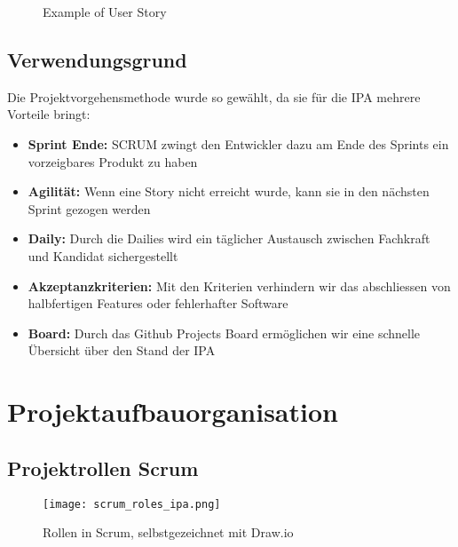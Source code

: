 \begin{figure}[h]
    \centering
    \caption{Example of User Story}
\end{figure}

\section{Verwendungsgrund}
Die Projektvorgehensmethode wurde so gewählt, da sie für die IPA mehrere Vorteile bringt:

\begin{itemize}
    \item \textbf{Sprint Ende:} SCRUM zwingt den Entwickler dazu am Ende des Sprints ein vorzeigbares Produkt zu haben
    \item \textbf{Agilität:} Wenn eine Story nicht erreicht wurde, kann sie in den nächsten Sprint gezogen werden
    \item \textbf{Daily:} Durch die Dailies wird ein täglicher Austausch zwischen Fachkraft und Kandidat sichergestellt
    \item \textbf{Akzeptanzkriterien:} Mit den Kriterien verhindern wir das abschliessen von halbfertigen Features oder fehlerhafter Software
    \item \textbf{Board:} Durch das Github Projects Board ermöglichen wir eine schnelle Übersicht über den Stand der IPA
\end{itemize}

\chapter{Projektaufbauorganisation}

\section{Projektrollen Scrum}

\begin{figure}[h]
    \centering
    \texttt{[image: scrum\_roles\_ipa.png]}
    \caption{Rollen in Scrum, selbstgezeichnet mit Draw.io}
\end{figure}

